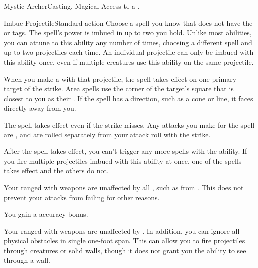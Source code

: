   \begin{magicalfeat}{Mystic Archer}{Casting, Magical}
    \featpre Access to a .

    \begin{magicalattuneability}{Imbue Projectile}{Standard action}
      \abilitytags {}
      \rankline
      Choose a spell you know that does not have the  or  tags.
      The spell's power is imbued in up to two  you hold.
      Unlike most  abilities, you can attune to this ability any number of times, choosing a different spell and up to two projectiles each time.
      An individual projectile can only be imbued with this ability once, even if multiple creatures use this ability on the same projectile.

      When you make a  with that projectile, the spell takes effect on one primary target of the strike.
      Area spells use the corner of the target's square that is closest to you as their .
      If the spell has a direction, such as a cone or line, it faces directly away from you.

      The spell takes effect even if the strike misses.
      Any attacks you make for the spell are , and are rolled separately from your attack roll with the strike.

      After the spell takes effect, you \briefly can't trigger any more spells with the  ability.
      If you fire multiple projectiles imbued with this ability at once, one of the spells takes effect and the others do not.
    \end{magicalattuneability}

     Your ranged  with  weapons are unaffected by all , such as from .
    This does not prevent your attacks from failing for other reasons.

     You gain a  accuracy bonus.

     Your ranged  with  weapons are unaffected by .
    In addition, you can ignore all physical obstacles in single one-foot span.
    This can allow you to fire projectiles through creatures or solid walls, though it does not grant you the ability to see through a wall.
  \end{magicalfeat}

